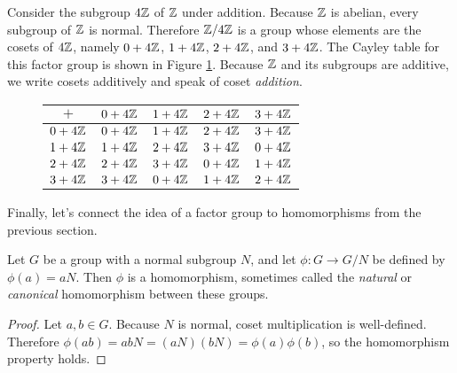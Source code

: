 \begin{example}
Consider the subgroup $4\mathbb{Z}$ of $\mathbb{Z}$ under addition. Because $\mathbb{Z}$ is abelian, every subgroup of $\mathbb{Z}$ is normal. Therefore $\mathbb{Z}/4\mathbb{Z}$ is a group whose elements are the cosets of $4\mathbb{Z}$, namely $0+4\mathbb{Z}$, $1+4\mathbb{Z}$, $2+4\mathbb{Z}$, and $3+4\mathbb{Z}$. The Cayley table for this factor group is shown in Figure \ref{z4z_cayley}. Because $\mathbb{Z}$ and its subgroups are additive, we write cosets additively and speak of coset \textit{addition}.

\begin{figure}[ht]
\centering
\begin{tabular}{c | c c c c}
    $+$     & $0+4\mathbb{Z}$ & $1+4\mathbb{Z}$ & $2+4\mathbb{Z}$ & $3+4\mathbb{Z}$ \\
    \hline
    $0+4\mathbb{Z}$ & $0+4\mathbb{Z}$ & $1+4\mathbb{Z}$ & $2+4\mathbb{Z}$ & $3+4\mathbb{Z}$ \\
    $1+4\mathbb{Z}$ & $1+4\mathbb{Z}$ & $2+4\mathbb{Z}$ & $3+4\mathbb{Z}$ & $0+4\mathbb{Z}$ \\
    $2+4\mathbb{Z}$ & $2+4\mathbb{Z}$ & $3+4\mathbb{Z}$ & $0+4\mathbb{Z}$ & $1+4\mathbb{Z}$ \\
    $3+4\mathbb{Z}$ & $3+4\mathbb{Z}$ & $0+4\mathbb{Z}$ & $1+4\mathbb{Z}$ & $2+4\mathbb{Z}$
\end{tabular}
\caption{}
\label{z4z_cayley}
\end{figure}
\end{example}

Finally, let's connect the idea of a factor group to homomorphisms from the previous section.

\begin{theorem}
Let $G$ be a group with a normal subgroup $N$, and let $\phi: G \to G/N$ be defined by $\phi(a) = aN$. Then $\phi$ is a homomorphism, sometimes called the \textit{natural} or \textit{canonical} homomorphism between these groups.
\end{theorem}

\begin{proof}
Let $a, b \in G$. Because $N$ is normal, coset multiplication is well-defined. Therefore $\phi(ab) = abN = (aN)(bN) = \phi(a)\phi(b)$, so the homomorphism property holds.
\end{proof}
